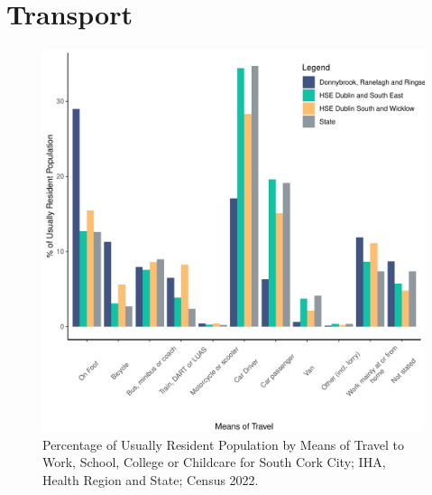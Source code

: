 \documentclass{article}
\begin{document}
\section{Transport}\label{sect:Trans}
\begin{figure}[H]
	\centering
	\includegraphics[width = 120mm]{../figures/TravelED.pdf}
	\caption{Percentage of Usually Resident Population by Means of Travel to Work, School, College or Childcare for South Cork City; IHA, Health Region and State; Census 2022.}
	\label{fig:vbnv}
	\end{figure}
\end{document}
